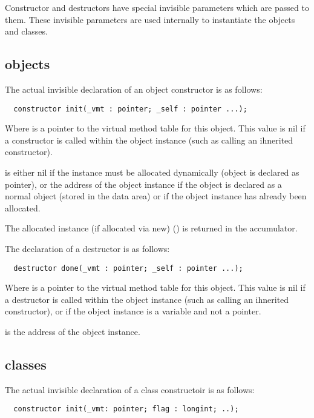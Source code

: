 Constructor and destructors have special invisible parameters
which are passed to them. These invisible parameters are used
internally to instantiate the objects and classes. 

\subsection{objects}

The actual invisible declaration of an object constructor
is as follows:

\begin{verbatim}
  constructor init(_vmt : pointer; _self : pointer ...);
\end{verbatim}

Where  is a pointer to the virtual method table
for this object. This value is nil if a constructor is called
within the object instance (such as calling an ihnerited constructor).

 is either nil if the instance must be allocated 
dynamically (object is declared as pointer), or the address of 
the object instance if the object is declared as a normal object
(stored in the data area) or if the object instance has already 
been allocated.

The allocated instance (if allocated via new) () 
is returned in the accumulator.


The declaration of a destructor is as follows:

\begin{verbatim}
  destructor done(_vmt : pointer; _self : pointer ...);
\end{verbatim}

Where  is a pointer to the virtual method table
for this object. This value is nil if a destructor is called
within the object instance (such as calling an ihnerited constructor),
or if the object instance is a variable and not a pointer.

 is the address of the object instance.


\subsection{classes}

The actual invisible declaration of a class constructoir
is as follows:

\begin{verbatim}
  constructor init(_vmt: pointer; flag : longint; ..);
\end{verbatim}

